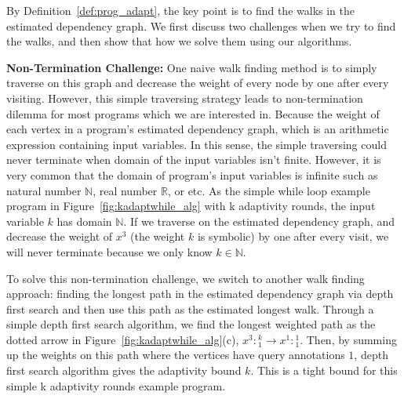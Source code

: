 By Definition~\ref{def:prog_adapt}, the key point is to find the walks in the estimated dependency graph. 
We first discuss two challenges when we try to find the walks,
and then show that how we solve them using our algorithms.

\textbf{Non-Termination Challenge:}
One naive walk finding method is to simply traverse on this graph and decrease the weight of every node by one after every visiting. However, this simple 
traversing strategy leads to non-termination dilemma for most programs which we are interested in. 
Because the weight of each vertex in a program's estimated dependency graph,
which is an arithmetic expression containing input variables. 
In this sense, the simple traversing could never terminate when domain of the input variables isn't finite.
However, it is very common that the domain of program's input variables is infinite such as natural number $\mathbb{N}$, real number $\mathbb{R}$, or etc. As the simple while loop example program in Figure~\ref{fig:kadaptwhile_alg} with k adaptivity rounds, the input variable $k$ has domain $\mathbb{N}$.
%
If we traverse on the estimated dependency graph, and decrease the weight of $x^3$ (the weight $k$ is symbolic) by one after every visit,
we will never terminate because we only know $k \in \mathbb{N}$.



To solve this non-termination challenge, we switch to another walk finding approach:
finding the longest path in the estimated dependency graph via depth first search and then use this path as the estimated longest walk.
Through a simple depth first search algorithm, we find the longest weighted path as the dotted arrow in Figure~\ref{fig:kadaptwhile_alg}(c),
$x^3: {}^k_1 \to x^1: {}^1_1 $.
Then, by summing up the weights on this path where the vertices have query annotations $1$, depth first search algorithm gives the adaptivity bound $k$.
This is a tight bound for this simple k adaptivity rounds example program.

